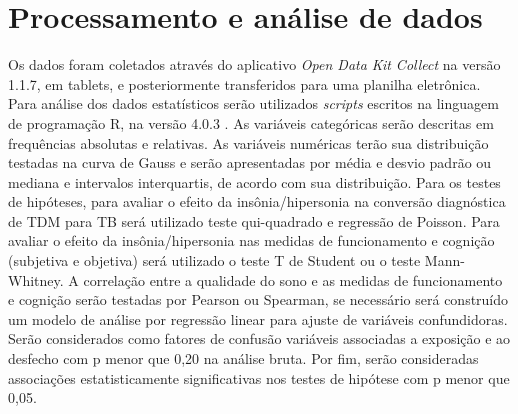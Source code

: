 \documentclass[chapter=TITLE,
               oneside,
               12pt,
               a4paper,
               english,
               brazil]{abntex2}    %
\begin{document}
\section{Processamento e análise de dados}\label{sec:analise}

    Os dados foram coletados através do aplicativo \textit{Open Data Kit Collect}
    na versão 1.1.7, em tablets, e posteriormente transferidos para uma planilha
    eletrônica. Para análise dos dados estatísticos serão utilizados
    \textit{scripts} escritos na linguagem de programação R, na versão 4.0.3
    \parencite{r_language}.
    As variáveis categóricas serão descritas em frequências absolutas e relativas.
    As variáveis numéricas terão sua distribuição testadas na curva de Gauss e serão
    apresentadas por média e desvio padrão ou mediana e intervalos interquartis,
    de acordo com sua distribuição.
    Para os testes de hipóteses, para avaliar o efeito da insônia/hipersonia na
    conversão diagnóstica de TDM para TB será utilizado teste qui-quadrado e
    regressão de Poisson. Para avaliar o efeito da insônia/hipersonia nas medidas
    de funcionamento e cognição (subjetiva e objetiva) será utilizado o teste T
    de Student ou o teste Mann-Whitney.
    A correlação entre a qualidade do sono e as medidas de funcionamento e cognição
    serão testadas por Pearson ou Spearman, se necessário será construído um modelo
    de análise por regressão linear para ajuste de variáveis confundidoras.
    Serão considerados como fatores de confusão variáveis associadas a exposição
    e ao desfecho com p menor que 0,20 na análise bruta. Por fim, serão consideradas
    associações estatisticamente significativas nos testes de hipótese com p
    menor que 0,05.
\end{document}
